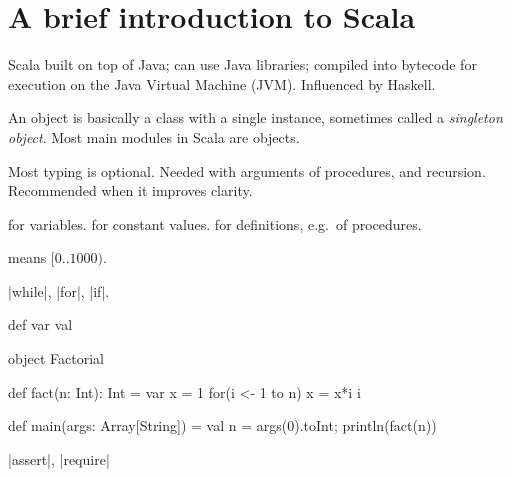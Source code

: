 \chapter{A brief introduction to Scala}
\label{app:scala}


Scala built on top of Java; can use Java libraries; compiled into bytecode for
execution on the Java Virtual Machine (JVM).  Influenced by Haskell.

An object is basically a class with a single instance, sometimes called a
\emph{singleton object}.  Most main modules in Scala are objects.

Most typing is optional.  Needed with arguments of procedures, and recursion.
Recommended when it improves clarity.

 for variables.   for constant values.   for
definitions, e.g.~of procedures.  

 means $[0 .. 1000)$. 

|while|, |for|, |if|.  

def var val

\begin{scala}
object Factorial{

  def fact(n: Int): Int = {
    var x = 1
    for(i <- 1 to n) x = x*i
    i
  }

  def main(args: Array[String]) = {
    val n = args(0).toInt; println(fact(n))
  } 
}
\end{scala}


|assert|, |require| 
